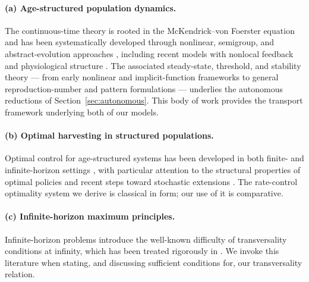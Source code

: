 \documentclass[pdflatex,sn-mathphys-num]{sn-jnl}
\theoremstyle{definition}
\theoremstyle{remark}
\begin{document}
\paragraph{(a) Age-structured population dynamics.}
The continuous-time theory is rooted in the McKendrick--von Foerster
equation \citep{mkendrick_applications_1925,von_foerster_remarks_1959,yu2026pattern} and
has been systematically developed through nonlinear, semigroup, and
abstract-evolution approaches
\citep{webb_semigroup_1984,webb_theory_1985,gao2022rolling,iannelli_mathematical_1995,%
iannelli_basic_2017,metz_dynamics_1986,cushing_introduction_1998,%
engel_one-parameter_2000,banasiak_perturbations_2006,magal_theory_2018},
including recent models with nonlocal feedback and physiological structure
\citep{wang2025analysis,wang2025analysis1,liang2025global}. The associated
steady-state, threshold, and stability theory --- from early nonlinear and
implicit-function frameworks
\citep{gurtin_non-linear_1974,gurtin_simple_1979,cushing_existence_1984,%
pruss_equilibrium_1981,pruss_stability_1983,busenberg_endemic_1988,liu2026ftu,%
busenberg_global_1991,diekmann_steady-state_2003} to general reproduction-number
and pattern formulations
\citep{thieme_mathematics_2018,inaba_age-structured_2006,inaba_stable_2017,%
walker_positive_2009,wang2026algebraic,yu2026beyond,%
wang2026damage,wang2026breakdown} --- underlies the autonomous
reductions of Section~\ref{sec:autonomous}. This body of work provides the
transport framework underlying both of our models.

\paragraph{(b) Optimal harvesting in structured populations.}
Optimal control for age-structured systems has been developed in both
finite- and infinite-horizon settings
\citep{brokate_pontryagins_1985,barbu_optimal_1999,anita_analysis_2000,yu2026rigorous,
anita_optimal_1998,anita_optimal_2009,zhao_optimal_2005,fister_optimal_2004},
with particular attention to the structural properties of optimal policies
\citep{hritonenko_structure_2007,liu2026computational,veliov_optimal_2008} and recent steps toward
stochastic extensions \citep{yu2026microscopic}.
The rate-control optimality system we derive is classical in form; our use
of it is comparative.

\paragraph{(c) Infinite-horizon maximum principles.}
Infinite-horizon problems introduce the well-known difficulty of
transversality conditions at infinity, which has been treated rigorously in
\citep{arrow_optimal_1969,carlson_infinite_1991,aseev_pontryagin_2004,%
aseev_infinite-horizon_2012,yu2026chemotactic,aseev_maximum_2015}. We invoke this literature
when stating, and discussing sufficient conditions for, our transversality
relation.
\end{document}
